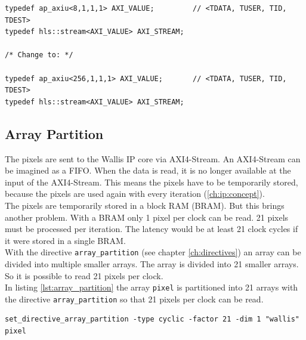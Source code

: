 
\begin{minipage}{\textwidth}
\begin{lstlisting}[style=CStyle, caption=Calculation of the division for the Wallis filter, label=lst:ip:axistream]
typedef ap_axiu<8,1,1,1> AXI_VALUE;			// <TDATA, TUSER, TID, TDEST>
typedef hls::stream<AXI_VALUE> AXI_STREAM;

/* Change to: */

typedef ap_axiu<256,1,1,1> AXI_VALUE;		// <TDATA, TUSER, TID, TDEST>
typedef hls::stream<AXI_VALUE> AXI_STREAM;
\end{lstlisting}
\end{minipage}

\subsection{Array Partition}
The pixels are sent to the Wallis IP core via AXI4-Stream. An AXI4-Stream can be imagined as a FIFO. When the data is read, it is no longer available at the input of the AXI4-Stream. This means the pixels have to be temporarily stored, because the pixels are used again with every iteration (\ref{ch:ip:concept}). \\
The pixels are temporarily stored in a block RAM (BRAM). But this brings another
problem. With a BRAM only 1 pixel per clock can be read. 21 pixels must be
processed per iteration. The latency would be at least 21 clock cycles if it
were stored in a single BRAM. \\
With the directive \texttt{array\_partition} (see chapter \ref{ch:directives})
an array can be divided into multiple smaller arrays. The array is divided into 21 smaller arrays. So it is possible to read 21 pixels per clock. \\
In listing \ref{lst:array_partition} the array \texttt{pixel} is partitioned into 21 arrays with the directive \texttt{array\_partition} so that 21 pixels per clock can be read. 

\begin{minipage}{\textwidth}
\begin{lstlisting}[style=TextStyle, caption=Set directive array\_partition, label=lst:array_partition]
set_directive_array_partition -type cyclic -factor 21 -dim 1 "wallis" pixel
\end{lstlisting}
\end{minipage}



